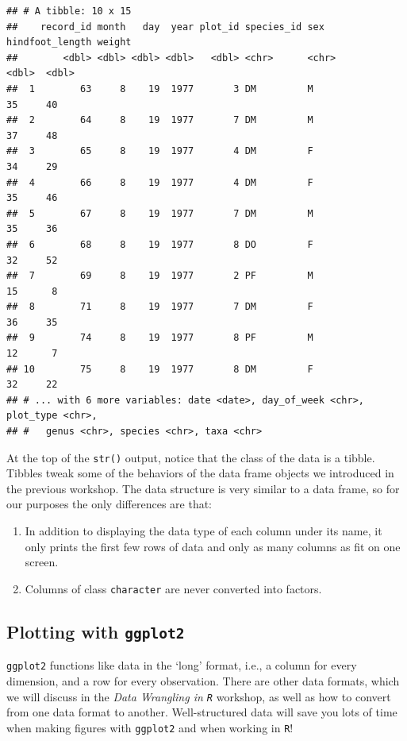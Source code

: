 \documentclass[
]{article}
\providecommand{\tightlist}{%
  \setlength{\itemsep}{0pt}\setlength{\parskip}{0pt}}
\begin{document}
\begin{verbatim}
## # A tibble: 10 x 15
##    record_id month   day  year plot_id species_id sex   hindfoot_length weight
##        <dbl> <dbl> <dbl> <dbl>   <dbl> <chr>      <chr>           <dbl>  <dbl>
##  1        63     8    19  1977       3 DM         M                  35     40
##  2        64     8    19  1977       7 DM         M                  37     48
##  3        65     8    19  1977       4 DM         F                  34     29
##  4        66     8    19  1977       4 DM         F                  35     46
##  5        67     8    19  1977       7 DM         M                  35     36
##  6        68     8    19  1977       8 DO         F                  32     52
##  7        69     8    19  1977       2 PF         M                  15      8
##  8        71     8    19  1977       7 DM         F                  36     35
##  9        74     8    19  1977       8 PF         M                  12      7
## 10        75     8    19  1977       8 DM         F                  32     22
## # ... with 6 more variables: date <date>, day_of_week <chr>, plot_type <chr>,
## #   genus <chr>, species <chr>, taxa <chr>
\end{verbatim}

At the top of the \texttt{str()} output, notice that the class of the
data is a tibble. Tibbles tweak some of the behaviors of the data frame
objects we introduced in the previous workshop. The data structure is
very similar to a data frame, so for our purposes the only differences
are that:

\begin{enumerate}
\def\labelenumi{\arabic{enumi}.}
\tightlist
\item
  In addition to displaying the data type of each column under its name,
  it only prints the first few rows of data and only as many columns as
  fit on one screen.
\item
  Columns of class \texttt{character} are never converted into factors.
\end{enumerate}

\hypertarget{plotting-with-ggplot2}{%
\subsection{\texorpdfstring{Plotting with
\textbf{\texttt{ggplot2}}}{Plotting with ggplot2}}\label{plotting-with-ggplot2}}

\texttt{ggplot2} functions like data in the `long' format, i.e., a
column for every dimension, and a row for every observation. There are
other data formats, which we will discuss in the \emph{Data Wrangling in
\texttt{R}} workshop, as well as how to convert from one data format to
another. Well-structured data will save you lots of time when making
figures with \texttt{ggplot2} and when working in \texttt{R}!
\end{document}
